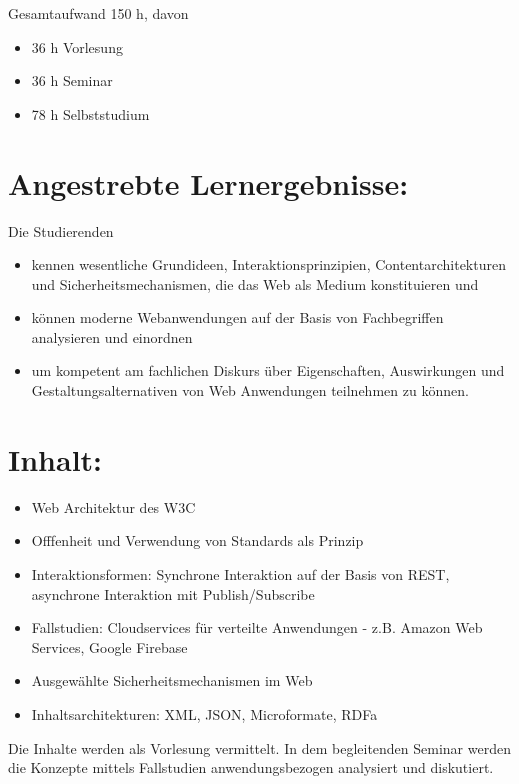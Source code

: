 Gesamtaufwand 150 h, davon

\begin{itemize}
\item
  36 h Vorlesung
\item
  36 h Seminar
\item
  78 h Selbststudium
\end{itemize}

\section*{Angestrebte
Lernergebnisse:}\label{angestrebte-lernergebnisse-11}

Die Studierenden

\begin{itemize}
\item
  kennen wesentliche Grundideen, Interaktionsprinzipien,
  Contentarchitekturen und Sicherheitsmechanismen, die das Web als
  Medium konstituieren und
\item
  können moderne Webanwendungen auf der Basis von Fachbegriffen
  analysieren und einordnen
\item
  um kompetent am fachlichen Diskurs über Eigenschaften, Auswirkungen
  und Gestaltungsalternativen von Web Anwendungen teilnehmen zu können.
\end{itemize}

\section*{Inhalt:}\label{inhalt-11}

\begin{itemize}
\item
  Web Architektur des W3C
\item
  Offfenheit und Verwendung von Standards als Prinzip
\item
  Interaktionsformen: Synchrone Interaktion auf der Basis von REST,
  asynchrone Interaktion mit Publish/Subscribe
\item
  Fallstudien: Cloudservices für verteilte Anwendungen - z.B. Amazon Web
  Services, Google Firebase
\item
  Ausgewählte Sicherheitsmechanismen im Web
\item
  Inhaltsarchitekturen: XML, JSON, Microformate, RDFa
\end{itemize}

Die Inhalte werden als Vorlesung vermittelt. In dem begleitenden Seminar
werden die Konzepte mittels Fallstudien anwendungsbezogen analysiert und
diskutiert.

